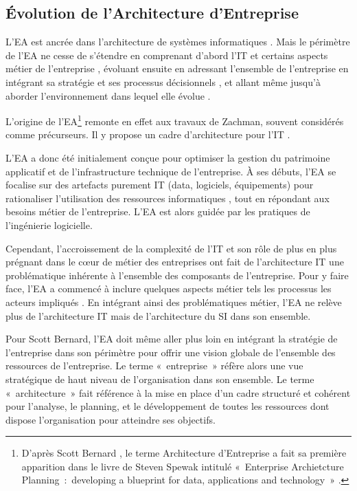 	\subsection{Évolution de l'Architecture d'Entreprise}

L'EA est ancrée dans l'architecture de systèmes informatiques \cite{kappelman2008enterprise}. Mais le périmètre de l'EA ne cesse de s'étendre en comprenant d'abord l'IT et certains aspects métier de l'entreprise \cite{winter2006essential}, évoluant ensuite en adressant l'ensemble de l'entreprise en intégrant sa stratégie et ses processus décisionnels \cite{ross2006enterprise}, et allant même jusqu'à aborder l'environnement dans lequel elle évolue \cite{lapalme2012three}.

L'origine de l'EA\footnote{D'après Scott Bernard \cite{bernard2012introduction}, le terme Architecture d'Entreprise a fait sa première apparition dans le livre de Steven Spewak intitulé «~Enterprise Archietcture Planning~:~developing a blueprint for data, applications and 
technology~» \cite{spewak1993enterprise}.} remonte en effet aux travaux de Zachman, souvent considérés comme précurseurs. Il y propose un cadre d'architecture pour l'IT \cite{zachman1987framework}.

L'EA a donc été initialement conçue pour optimiser la gestion du patrimoine applicatif et de l'infrastructure technique de l'entreprise. À ses débuts, l'EA se focalise sur des artefacts purement IT (data, logiciels, équipements) pour rationaliser l'utilisation des ressources informatiques \cite{winter2006essential}, tout en répondant aux besoins métier de l'entreprise. 
L'EA est alors guidée par les pratiques de l'ingénierie logicielle. 

Cependant, l'accroissement de la complexité de l'IT et son rôle de plus en plus prégnant dans le cœur de métier des entreprises \cite{ranganathan2005enterprise} ont fait de l'architecture IT une problématique inhérente à l'ensemble des composants de l'entreprise. Pour y faire face, l'EA a commencé à inclure quelques aspects métier tels les processus les acteurs impliqués \cite{winter2006essential}. En intégrant ainsi des problématiques métier, l'EA ne relève plus de l'architecture IT mais de l'architecture du SI dans son ensemble.

Pour Scott Bernard, l'EA doit même aller plus loin en intégrant la stratégie de 
l'entreprise \cite{bernard2012introduction} dans son périmètre pour offrir une vision globale de l'ensemble des ressources de l'entreprise. Le terme «~entreprise~» réfère alors une vue stratégique de haut niveau de l'organisation dans son ensemble. Le terme «~architecture~» fait référence à la mise en place d'un cadre structuré et cohérent pour l'analyse, le planning, et le développement de toutes les ressources dont dispose l'organisation pour atteindre ses objectifs. 

